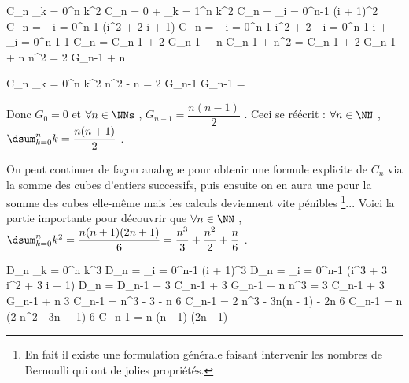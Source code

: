 \medskip

\begin{explain}[style = sar, ope = \iff]
	C_n \eqdef  \dsum_{k = 0}^{n} k^2
		\explnext{}
	C_n = 0 + \dsum_{k = 1}^{n} k^2
	C_n = \dsum_{i = 0}^{n-1} (i + 1)^2
		\explnext{}
	C_n = \dsum_{i = 0}^{n-1} (i^2 + 2 i + 1)
		\explnext{}
	C_n = \dsum_{i = 0}^{n-1} i^2 + 2 \dsum_{i = 0}^{n-1} i + \dsum_{i = 0}^{n-1} 1
		\explnext{}
	C_n = C_{n-1} + 2 G_{n-1} + n
	C_{n-1} + n^2 = C_{n-1} + 2 G_{n-1} + n
		\explnext{}
	n^2 = 2 G_{n-1} + n
\end{explain}


\begin{explain}[style = sar, ope = \iff]
	C_n \eqdef  \dsum_{k = 0}^{n} k^2
		\explnext{}
	n^2 - n = 2 G_{n-1}
		\explnext{}
	G_{n-1} = 
\end{explain}

\bigskip

Donc $G_0 = 0$ et $\forall n \in \NNs$ , $G_{n-1} = \dfrac{n(n - 1)}{2}$ .
Ceci se réécrit :
$\forall n \in \NN$ , $\dsum_{k = 0}^{n} k = \dfrac{n(n + 1)}{2}$ .

\medskip

On peut continuer de façon analogue pour obtenir une formule explicite de $C_n$ via la somme des cubes d'entiers successifs, puis ensuite on en aura une pour la somme des cubes elle-même mais les calculs deviennent vite pénibles
\footnote{
	En fait il existe une formulation générale faisant intervenir les nombres de Bernoulli qui ont de jolies propriétés.
}...
Voici la partie importante pour découvrir que 
$\forall n \in \NN$ , $\dsum_{k = 0}^{n} k^2 = \dfrac{n (n + 1) (2n + 1)}{6} = \dfrac{n^3}{3} + \dfrac{n^2}{2} + \dfrac{n}{6}$ .

\medskip

\begin{explain}[style = sar, ope = \iff]
	D_n \eqdef  \dsum_{k = 0}^{n} k^3
		\explnext{}
	D_n = \dsum_{i = 0}^{n-1} (i + 1)^3
		\explnext{}
	D_n = \dsum_{i = 0}^{n-1} (i^3 + 3 i^2 + 3 i + 1)
		\explnext{}
	D_n = D_{n-1} + 3 C_{n-1} + 3 G_{n-1} + n
		\explnext{}
	n^3 = 3 C_{n-1} + 3 G_{n-1} + n
		\explnext{}
	3 C_{n-1} = n^3 - 3 \cdot {} - n
		\explnext{}
	6 C_{n-1} = 2 n^3 - 3n(n - 1) - 2n
		\explnext{}
	6 C_{n-1} = n (2 n^2 - 3n + 1)
	6 C_{n-1} = n (n - 1) (2n - 1)
\end{explain}


